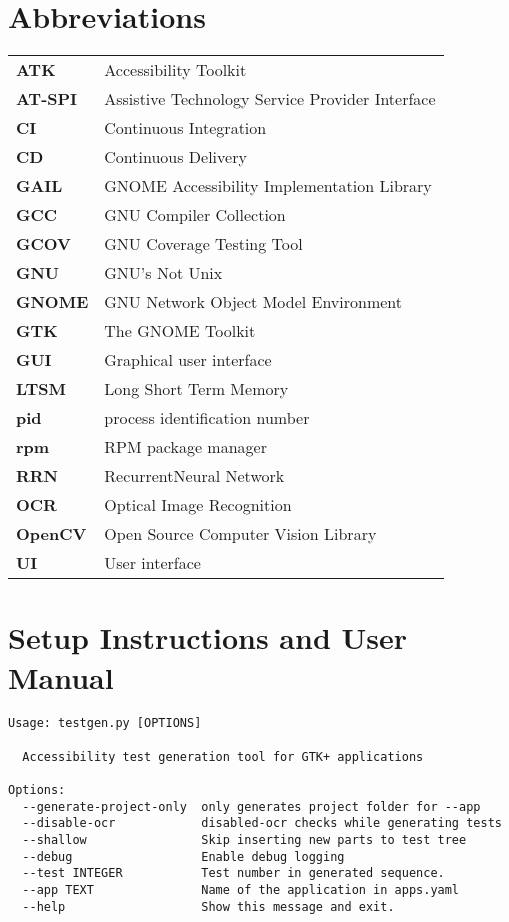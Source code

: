 
\chapter{Abbreviations}
\renewcommand{\arraystretch}{1.2}
\begin{tabular}{lp{12cm}}%
\textbf{ATK} & Accessibility Toolkit \\
\textbf{AT-SPI} & Assistive Technology Service Provider Interface \\
\textbf{CI} & Continuous Integration \\
\textbf{CD} & Continuous Delivery \\
\textbf{GAIL} & GNOME Accessibility Implementation Library \\
\textbf{GCC} & GNU Compiler Collection \\
\textbf{GCOV} & GNU Coverage Testing Tool \\
\textbf{GNU} & GNU's Not Unix \\
\textbf{GNOME} & GNU Network Object Model Environment \\
\textbf{GTK} & The GNOME Toolkit \\
\textbf{GUI} & Graphical user interface \\
\textbf{LTSM} & Long Short Term Memory \\
\textbf{pid} & process identification number \\
\textbf{rpm} & RPM package manager \\
\textbf{RRN} & RecurrentNeural Network \\
\textbf{OCR} & Optical Image Recognition \\
\textbf{OpenCV} & Open Source Computer Vision Library \\
\textbf{UI} & User interface \\
\end{tabular}


\chapter{Setup Instructions and User Manual}\label{manual}

\begin{lstlisting}[]
Usage: testgen.py [OPTIONS]

  Accessibility test generation tool for GTK+ applications

Options:
  --generate-project-only  only generates project folder for --app
  --disable-ocr            disabled-ocr checks while generating tests
  --shallow                Skip inserting new parts to test tree
  --debug                  Enable debug logging
  --test INTEGER           Test number in generated sequence.
  --app TEXT               Name of the application in apps.yaml
  --help                   Show this message and exit.

\end{lstlisting}




